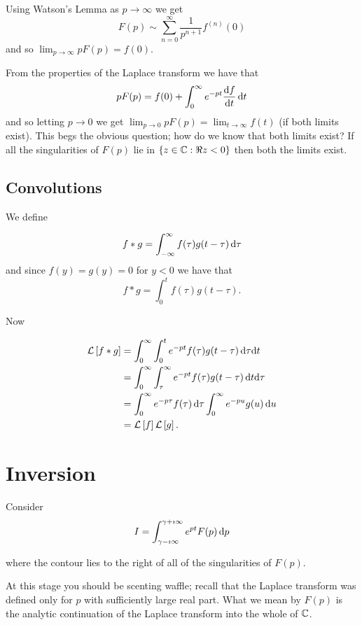 \documentclass{notes}
\newcommand{\cL}[1]{\mathcal{L}\left[#1\right]}
\theoremstyle{plain}
\begin{document}
Using Watson's Lemma as $p \to \infty$ we get
\[
F(p) \sim \sum_{n=0}^\infty \frac{1}{p^{n+1}} f^{(n)}(0)
\]
and so $\lim_{p \to \infty} p F(p) = f(0)$.

From the properties of the Laplace transform  we have
that
\[
p F(p) = f(0) + \int_0^\infty e^{-p t} \frac{\mathrm{d} f}{\mathrm{d} t}\,\mathrm{d} t
\]
and so letting $p \to 0$ we get $\lim_{p \to 0} p F(p) = \lim_{t \to
  \infty} f(t)$ (if both limits exist).  This begs the obvious
question; how do we know that both limits exist?  If all
the singularities of $F(p)$ lie in $\{ z \in \mathbb{C} : \Re z < 0 \}$
then both the limits exist.

\subsection{Convolutions}

We define

\begin{equation} \label{eq:convol}
f \ast g = \int_{-\infty}^\infty f(\tau) g(t -\tau)\, \mathrm{d} \tau
\end{equation}
and since $f(y) = g(y) = 0$ for $y < 0$ we have that
\[
f \ast g = \int_0^t f(\tau) g(t - \tau).
\]

Now

\begin{align*}
\cL{f \ast g} &= \int_0^\infty \int_0^t e^{-p t} f(\tau)
g(t - \tau)\, \ud \tau \ud t \\
&= \int_0^\infty \int_\tau^\infty e^{-p t} f(\tau) g(t-\tau)\, \ud t
\ud \tau \\
&= \int_0^\infty e^{-p \tau} f(\tau)\, \ud \tau
\int_0^\infty e^{-p u} g(u)\, \ud u \\
&= \cL{f} \cL{g}.
\end{align*}

\section{Inversion}

Consider
\[
I = \int_{\gamma - \imath \infty}^{\gamma + \imath \infty}
e^{p t} F(p)\, \mathrm{d} p
\]

where the contour lies to the right of all of the singularities of
$F(p)$.

At this stage you should be scenting waffle; recall that the Laplace
transform was defined only for $p$ with sufficiently large real part.
What we mean by $F(p)$ is the analytic continuation of the Laplace transform
into the whole of $\mathbb{C}$.
\end{document}
